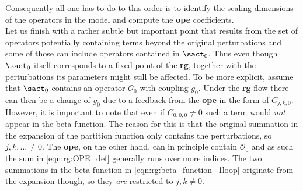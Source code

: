 \documentclass[english, parskip=full]{scrartcl}
\renewcommand{\gls}[1]{\textbf{#1}}
\begin{document}
Consequently all one has to do to this order is to identify the scaling dimensions of the operators in the model and compute the \gls{ope} coefficients.\\
Let us finish with a rather subtle but important point that results from the set of operators potentially containing terms beyond the original perturbations and some of those can include operators contained in $\sact_0$.
Thus even though $\sact_0$ itself corresponds to a fixed point of the \gls{rg}, together with the perturbations its parameters might still be affected.
To be more explicit, assume that $\sact_0$ contains an operator $\mathcal{O}_0$ with coupling $g_0$.
Under the \gls{rg} flow there can then be a change of $g_0$ due to a feedback from the \gls{ope} in the form of $C_{j,k,0}$.
However, it is important to note that even if $C_{0,0,0} \neq 0$ such a term would \emph{not} appear in the beta function.
The reason for this is that the original summation in the expansion of the partition function only contains the perturbations, so $j,k,\dots \neq 0$.
The \gls{ope}, on the other hand, can in principle contain $\mathcal{O}_0$ and as such the sum in \autoref{eqn:rg:OPE_def} generally runs over more indices.
The two summations in the beta function in \autoref{eqn:rg:beta_function_1loop} originate from the expansion though, so they \emph{are} restricted to $j,k\neq 0$.
\end{document}
